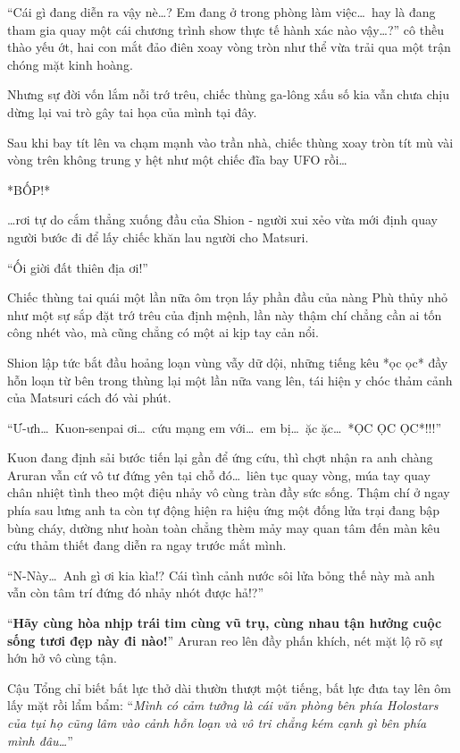 \documentclass[../main.tex]{subfiles}
\begin{document}
``Cái gì đang diễn ra vậy nè\dots? Em đang ở trong phòng làm việc\dots\ hay là đang tham gia quay một cái chương trình show thực tế hành xác nào vậy\dots?'' cô thều thào yếu ớt, hai con mắt đảo điên xoay vòng tròn như thể vừa trải qua một trận chóng mặt kinh hoàng.

Nhưng sự đời vốn lắm nỗi trớ trêu, chiếc thùng ga-lông xấu số kia vẫn chưa chịu dừng lại vai trò gây tai họa của mình tại đây.

Sau khi bay tít lên va chạm mạnh vào trần nhà, chiếc thùng xoay tròn tít mù vài vòng trên không trung y hệt như một chiếc đĩa bay UFO rồi\dots

*BỐP!*

\dots rơi tự do cắm thẳng xuống đầu của Shion - người xui xẻo vừa mới định quay người bước đi để lấy chiếc khăn lau người cho Matsuri.

``Ối giời đất thiên địa ơi!''

Chiếc thùng tai quái một lần nữa ôm trọn lấy phần đầu của nàng Phù thủy nhỏ như một sự sắp đặt trớ trêu của định mệnh, lần này thậm chí chẳng cần ai tốn công nhét vào, mà cũng chẳng có một ai kịp tay cản nổi.


Shion lập tức bắt đầu hoảng loạn vùng vẫy dữ dội, những tiếng kêu *ọc ọc* đầy hỗn loạn từ bên trong thùng lại một lần nữa vang lên, tái hiện y chóc thảm cảnh của Matsuri cách đó vài phút.

``Ư-ưh\dots\ Kuon-senpai ơi\dots\ cứu mạng em với\dots\ em bị\dots\ ặc ặc\dots\ *ỌC ỌC ỌC*!!!''

Kuon đang định sải bước tiến lại gần để ứng cứu, thì chợt nhận ra anh chàng Aruran vẫn cứ vô tư đứng yên tại chỗ đó\dots\ liên tục quay vòng, múa tay quay chân nhiệt tình theo một điệu nhảy vô cùng tràn đầy sức sống. Thậm chí ở ngay phía sau lưng anh ta còn tự động hiện ra hiệu ứng một đống lửa trại đang bập bùng cháy, dường như hoàn toàn chẳng thèm mảy may quan tâm đến màn kêu cứu thảm thiết đang diễn ra ngay trước mắt mình.

``N-Này\dots\ Anh gì ơi kia kìa!? Cái tình cảnh nước sôi lửa bỏng thế này mà anh vẫn còn tâm trí đứng đó nhảy nhót được hả!?''

``\textbf{Hãy cùng hòa nhịp trái tim cùng vũ trụ, cùng nhau tận hưởng cuộc sống tươi đẹp này đi nào!}'' Aruran reo lên đầy phấn khích, nét mặt lộ rõ sự hớn hở vô cùng tận.

Cậu Tổng chỉ biết bất lực thở dài thườn thượt một tiếng, bất lực đưa tay lên ôm lấy mặt rồi lẩm bẩm: ``\textit{Mình có cảm tưởng là cái văn phòng bên phía Holostars của tụi họ cũng lâm vào cảnh hỗn loạn và vô tri chẳng kém cạnh gì bên phía mình đâu\dots}''
\end{document}
